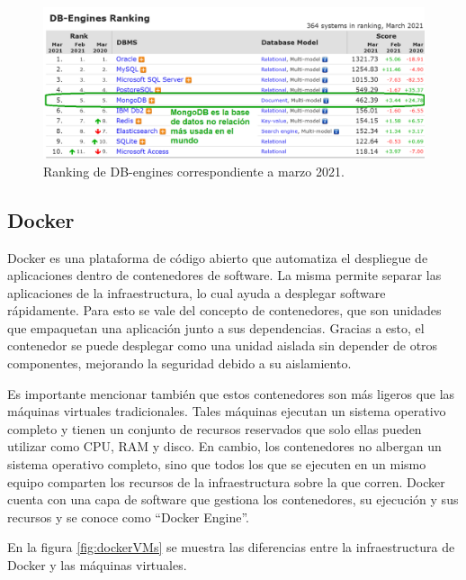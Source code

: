 \begin{figure}[ht]
	\centering
	\includegraphics[width=1\textwidth]{./Figures/mongodb.png}
	\caption{Ranking de DB-engines correspondiente a marzo 2021.}
	\label{fig:mongodb}
\end{figure} 

\subsection{Docker}

Docker es una plataforma de código abierto que automatiza el despliegue de aplicaciones dentro de contenedores de software. La misma  permite separar las aplicaciones de la infraestructura, lo cual ayuda a desplegar software rápidamente. Para esto se vale del concepto de contenedores, que son unidades que empaquetan una aplicación junto a sus dependencias. Gracias a esto, el contenedor se puede desplegar como una unidad aislada sin depender de otros componentes, mejorando la seguridad debido a su aislamiento. 

Es importante mencionar también que estos contenedores son más ligeros que las máquinas virtuales tradicionales. Tales máquinas ejecutan un sistema operativo completo y tienen un conjunto de recursos reservados que solo ellas pueden utilizar como CPU, RAM y disco. En cambio, los contenedores no albergan un sistema operativo completo, sino que todos los que se ejecuten en un mismo equipo comparten los recursos de la infraestructura sobre la que corren. Docker cuenta con una capa de software que gestiona los contenedores, su ejecución y sus recursos y se conoce como ``Docker Engine''.

En la figura \ref{fig:dockerVMs} se muestra las diferencias entre la infraestructura de Docker y las máquinas virtuales.

